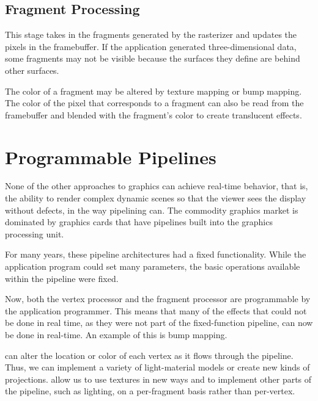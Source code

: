 \documentclass[../COS3712_Notes.tex]{subfiles}
\begin{document}
      \subsection{Fragment Processing}
        This stage takes in the fragments generated by the rasterizer
        and updates the pixels in the framebuffer.
        If the application generated three-dimensional data,
        some fragments may not be visible
        because the surfaces they define are behind other surfaces.

        The color of a fragment may be altered by texture mapping or bump mapping.
        The color of the pixel that corresponds to a fragment
        can also be read from the framebuffer
        and blended with the fragment's color
        to create translucent effects.

    \pagebreak

    \section{Programmable Pipelines}
      None of the other approaches to graphics
      can achieve real-time behavior,
      that is, the ability to render complex dynamic scenes
      so that the viewer sees the display without defects,
      in the way pipelining can.
      The commodity graphics market is dominated by graphics cards
      that have pipelines built into the graphics processing unit.

      For many years, these pipeline architectures had a fixed functionality.
      While the application program could set many parameters,
      the basic operations available within the pipeline were fixed.

      Now, both the vertex processor and the fragment processor are
      programmable by the application programmer.
      This means that many of the effects that could not be done in real time,
      as they were not part of the fixed-function pipeline,
      can now be done in real-time.
      An example of this is bump mapping.

       can alter the location or color of each vertex
      as it flows through the pipeline.
      Thus, we can implement a variety of light-material models
      or create new kinds of projections.
       allow us to use textures in new ways
      and to implement other parts of the pipeline,
      such as lighting,
      on a per-fragment basis rather than per-vertex.
\end{document}
